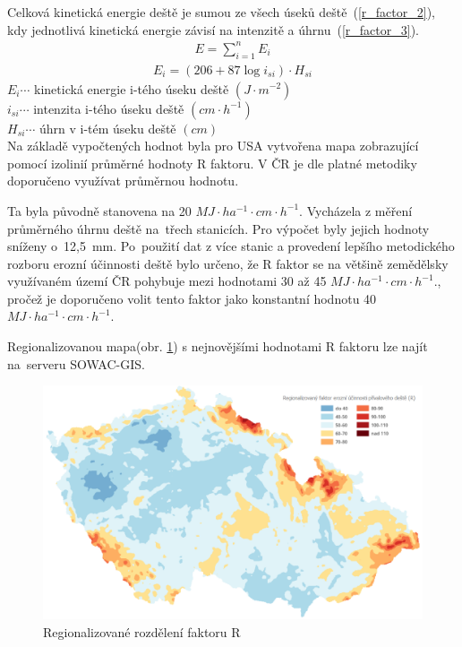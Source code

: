 Celková kinetická energie deště je sumou ze všech úseků
deště~(\ref{r_factor_2}), kdy jednotlivá kinetická energie závisí na
intenzitě a úhrnu~(\ref{r_factor_3}).\cite{usle1978}
\begin{align}
   \label{r_factor_2} E=\sum_{i=1}^n E_{i}
\end{align}
\begin{align}
   \label{r_factor_3} E_{i}=\left( 206+87 \log i_{si} \right) \cdot H_{si}
\end{align}
\hspace*{2cm}$E_{i} \cdots$ kinetická energie i-tého úseku deště
$\left( J\cdot m^{-2} \right)$\\
\hspace*{2cm}$i_{si} \cdots$ intenzita i-tého úseku deště $\left(
cm\cdot h^{-1} \right)$\\
\hspace*{2cm}$H_{si} \cdots$ úhrn v i-tém úseku deště $\left( cm
\right)$\\

Na základě vypočtených hodnot byla pro USA vytvořena mapa zobrazující
pomocí izolinií průměrné hodnoty R faktoru. \cite{usle1978} V ČR je
dle platné metodiky doporučeno využívat průměrnou
hodnotu.\cite{janecek2012}

Ta byla původně stanovena na 20 $MJ\cdot ha^{-1}\cdot cm \cdot
h^{-1}$. Vycházela z měření průměrného úhrnu deště na~třech stanicích. Pro výpočet byly jejich hodnoty sníženy o~12,5~mm. Po~použití dat z více
stanic a provedení lepšího metodického rozboru erozní účinnosti deště
bylo určeno, že R faktor se na většině zemědělsky využívaném území ČR
pohybuje mezi hodnotami 30 až 45 $MJ\cdot ha^{-1}\cdot cm \cdot
h^{-1}$., pročež je doporučeno volit tento faktor jako konstantní
hodnotu 40 $MJ\cdot ha^{-1}\cdot cm \cdot h^{-1}$.\cite{janecek2012}

Regionalizovanou mapa(obr. \ref{fig:r_faktor}) s nejnovějšími hodnotami
R faktoru lze najít na~serveru SOWAC-GIS.\cite{sowac}

\begin{figure}[H]
    \centering \includegraphics[scale=0.5]{./pictures/r_factor.png}
      \caption{Regionalizované rozdělení faktoru R}
      \label{fig:r_faktor}
\end{figure}

